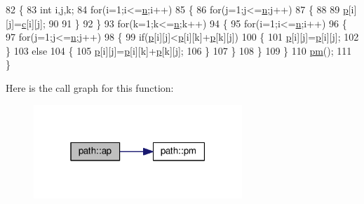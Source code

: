 \begin{DoxyCode}
82 \{
83     \textcolor{keywordtype}{int} i,j,k;
84     \textcolor{keywordflow}{for}(i=1;i<=\hyperlink{classpath_a4c3e3313530b46fb13cd4b5163b03cb0}{n};i++)
85     \{
86         \textcolor{keywordflow}{for}(j=1;j<=\hyperlink{classpath_a4c3e3313530b46fb13cd4b5163b03cb0}{n};j++)
87         \{
88 
89                 \hyperlink{classpath_a74b571902c8e9e488f7bcc38630f0652}{p}[i][j]=\hyperlink{classpath_a44e02858ba6e199f35611952bd5e42db}{c}[i][j];
90 
91         \}
92     \}
93     \textcolor{keywordflow}{for}(k=1;k<=\hyperlink{classpath_a4c3e3313530b46fb13cd4b5163b03cb0}{n};k++)
94     \{
95         \textcolor{keywordflow}{for}(i=1;i<=\hyperlink{classpath_a4c3e3313530b46fb13cd4b5163b03cb0}{n};i++)
96         \{
97             \textcolor{keywordflow}{for}(j=1;j<=\hyperlink{classpath_a4c3e3313530b46fb13cd4b5163b03cb0}{n};j++)
98             \{
99                 \textcolor{keywordflow}{if}(\hyperlink{classpath_a74b571902c8e9e488f7bcc38630f0652}{p}[i][j]<\hyperlink{classpath_a74b571902c8e9e488f7bcc38630f0652}{p}[i][k]+\hyperlink{classpath_a74b571902c8e9e488f7bcc38630f0652}{p}[k][j])
100                 \{
101                     \hyperlink{classpath_a74b571902c8e9e488f7bcc38630f0652}{p}[i][j]=\hyperlink{classpath_a74b571902c8e9e488f7bcc38630f0652}{p}[i][j];
102                 \}
103                 \textcolor{keywordflow}{else}
104                 \{
105                 \hyperlink{classpath_a74b571902c8e9e488f7bcc38630f0652}{p}[i][j]=\hyperlink{classpath_a74b571902c8e9e488f7bcc38630f0652}{p}[i][k]+\hyperlink{classpath_a74b571902c8e9e488f7bcc38630f0652}{p}[k][j];
106                 \}
107             \}
108         \}
109     \}
110     \hyperlink{classpath_af422edc0175627d75cfeb7dcad9b5ba3}{pm}();
111 \}
\end{DoxyCode}


Here is the call graph for this function\+:
\nopagebreak
\begin{figure}[H]
\begin{center}
\leavevmode
\includegraphics[width=223pt]{classpath_aa93bf33f14db6cd6312df7a66757060d_cgraph}
\end{center}
\end{figure}


